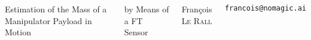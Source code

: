 \documentclass[aspectratio=1610]{beamer}
\begin{document}
\begin{frame}

  \vspace{0.02\textheight}

\begin{columns}[]
\column{37em}
\Large{\centerline{Estimation of the Mass of a Manipulator Payload in Motion}}

\Large{\centerline{ by Means of a FT Sensor}}

\vspace{0.1\textheight}

\small{\centerline{François \textsc{Le Rall}}}
\scriptsize{\centerline{\tt francois@nomagic.ai}}
\scriptsize{\centerline{}}
\end{columns}
\end{frame}

\end{document}
